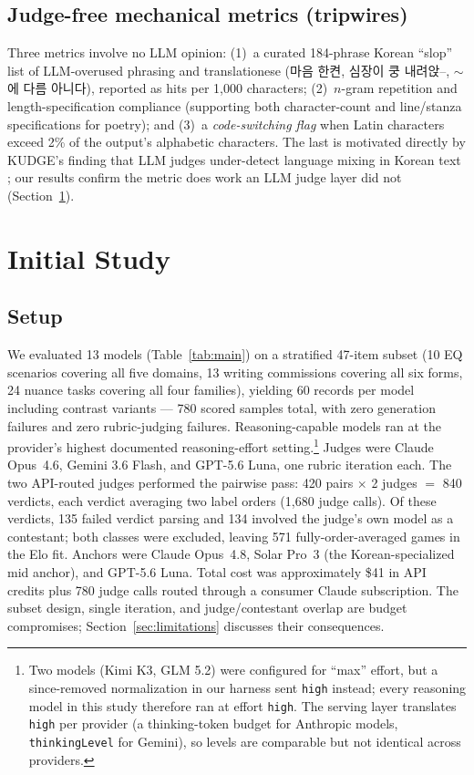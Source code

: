 \documentclass[11pt]{article}
\newcommand{\ko}[1]{#1}
\begin{document}
\subsection{Judge-free mechanical metrics (tripwires)}

Three metrics involve no LLM opinion: (1)~a curated 184-phrase Korean
``slop'' list of LLM-overused phrasing and translationese
(\ko{마음 한켠}, \ko{심장이 쿵 내려앉}--, \ko{$\sim$에 다름 아니다}),
reported as hits per 1{,}000 characters; (2)~$n$-gram repetition and
length-specification compliance (supporting both character-count and
line/stanza specifications for poetry); and (3)~a \emph{code-switching
flag} when Latin characters exceed 2\% of the output's alphabetic
characters. The last is
motivated directly by KUDGE's finding that LLM judges under-detect
language mixing in Korean text \citep{son2024kudge}; our results confirm
the metric does work an LLM judge layer did not (Section~\ref{sec:results}).

\section{Initial Study}
\label{sec:results}

\subsection{Setup}

We evaluated 13 models (Table~\ref{tab:main}) on a stratified 47-item
subset (10 EQ scenarios covering all five domains, 13 writing commissions
covering all six forms, 24 nuance tasks covering all four families),
yielding 60 records per model including contrast variants --- 780 scored
samples total, with zero generation failures and zero rubric-judging
failures. Reasoning-capable models ran at the provider's highest
documented reasoning-effort setting.\footnote{Two models (Kimi K3, GLM 5.2)
were configured for ``max'' effort, but a since-removed normalization in
our harness sent \texttt{high} instead; every reasoning model in this
study therefore ran at effort \texttt{high}. The serving layer
translates \texttt{high} per provider (a thinking-token budget for
Anthropic models, \texttt{thinkingLevel} for Gemini), so levels are
comparable but not identical across providers.} Judges were Claude Opus~4.6, Gemini 3.6 Flash, and GPT-5.6
Luna, one rubric iteration each. The two API-routed judges performed the
pairwise pass: 420 pairs $\times$ 2 judges $=$ 840 verdicts, each
verdict averaging two label orders (1{,}680 judge calls). Of these
verdicts, 135 failed verdict parsing and 134 involved the judge's own
model as a contestant; both classes were excluded, leaving 571
fully-order-averaged games in the Elo fit. Anchors were Claude Opus~4.8, Solar Pro~3 (the Korean-specialized
mid anchor), and GPT-5.6 Luna. Total cost was approximately \$41 in API
credits plus 780 judge calls routed through a consumer Claude
subscription. The subset design, single iteration, and judge/contestant
overlap are budget compromises; Section~\ref{sec:limitations} discusses
their consequences.
\end{document}
